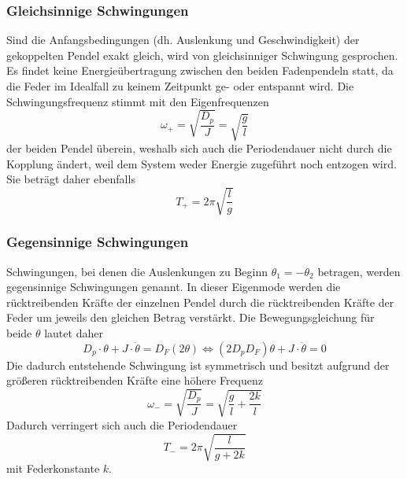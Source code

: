     \subsubsection{Gleichsinnige Schwingungen}
        Sind die Anfangsbedingungen (dh. Auslenkung und Geschwindigkeit) der gekoppelten
        Pendel exakt gleich, wird von gleichsinniger Schwingung gesprochen.
        Es findet keine Energieübertragung zwischen den beiden Fadenpendeln statt, da die 
        Feder im Idealfall zu keinem Zeitpunkt ge- oder entspannt wird. Die Schwingungsfrequenz
        stimmt mit den Eigenfrequenzen 
        \begin{equation}
            \omega_+= \sqrt{\dfrac{D_p}{J}}=\sqrt{\dfrac{g}{l}}
        \end{equation}
        der beiden Pendel überein, weshalb sich auch 
        die Periodendauer nicht durch die Kopplung ändert, weil dem System weder Energie 
        zugeführt noch entzogen wird. Sie beträgt daher ebenfalls 
        \begin{equation}
            T_+ = 2\pi \sqrt{\dfrac{l}{g}}
        \end{equation}
    \subsubsection{Gegensinnige Schwingungen}
        Schwingungen, bei denen die Auslenkungen zu Beginn $\theta_1=-\theta_2$ betragen, werden gegensinnige
        Schwingungen genannt. In dieser Eigenmode werden die rücktreibenden Kräfte der einzelnen Pendel 
        durch die rücktreibenden Kräfte der Feder um jeweils den gleichen Betrag verstärkt. Die 
        Bewegungsgleichung für beide $\theta$ lautet daher
        \begin{equation}
            D_p \cdot \theta +J\cdot \ddot \theta =D_F(2\theta)\Leftrightarrow 
            (2 D_p D_F) \theta +J\cdot \ddot \theta =0
        \end{equation}
        Die dadurch entstehende Schwingung ist symmetrisch und besitzt aufgrund der größeren 
        rücktreibenden Kräfte eine höhere Frequenz
        \begin{equation}
            \omega_-= \sqrt{\dfrac{D_p}{J}}=\sqrt{\dfrac{g}{l}+\dfrac{2 k}{l}}
        \end{equation}
        Dadurch verringert sich auch die Periodendauer
        \begin{equation}
            T_- = 2\pi \sqrt{\dfrac{l}{g+2k}}
        \end{equation}
        mit Federkonstante $k$.
